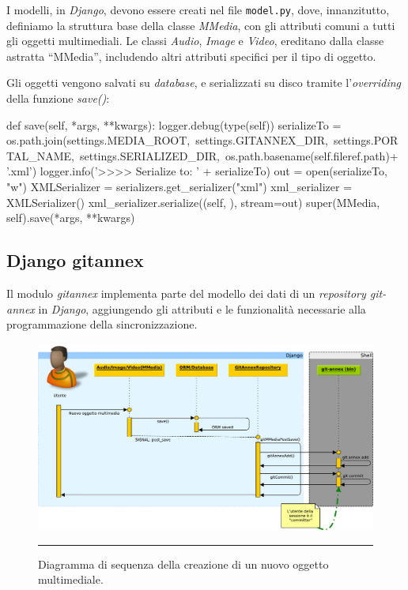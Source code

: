 I modelli, in \emph{Django}, devono essere creati nel file \verb|model.py|,
dove, innanzitutto, definiamo la struttura base della classe
\emph{MMedia}, con gli attributi comuni a tutti gli oggetti
multimediali. Le classi \emph{Audio}, \emph{Image} e \emph{Video},
ereditano dalla classe astratta ``MMedia'', includendo altri attributi
specifici per il tipo di oggetto.

Gli oggetti vengono salvati su \emph{database}, e serializzati su
disco tramite l'\emph{overriding} della funzione \emph{save()}:

\begin{code}
    def save(self, *args, **kwargs):
        logger.debug(type(self))
        serializeTo = os.path.join(settings.MEDIA_ROOT,\
                                   settings.GITANNEX_DIR,\
                                   settings.PORTAL_NAME,\
                                   settings.SERIALIZED_DIR,\
                                   os.path.basename(self.fileref.path)+ '.xml')
        logger.info('>>>> Serialize to: ' + serializeTo)
        out = open(serializeTo, "w")
        XMLSerializer = serializers.get_serializer("xml")
        xml_serializer = XMLSerializer()
        xml_serializer.serialize((self, ), stream=out)
        super(MMedia, self).save(*args, **kwargs)
\end{code}

\subsection{Django gitannex}

Il modulo \emph{gitannex} implementa parte del modello dei dati di un
\emph{repository git-annex} in \emph{Django}, aggiungendo gli attributi e le
funzionalità necessarie alla programmazione della sincronizzazione.

\begin{figure}[htbp]
  \centering
  \includegraphics[width=\textwidth]{./Figure/SequenceDiagram_NuovoOggetto-crop.pdf}
  \rule{35em}{0.5pt}
  \caption[Diagramma di sequenza della creazione di un nuovo oggetto
  multimediale]{Diagramma di sequenza della creazione di un nuovo
    oggetto multimediale.}
  \label{fig:SequenceDiagramAdd}
\end{figure}


